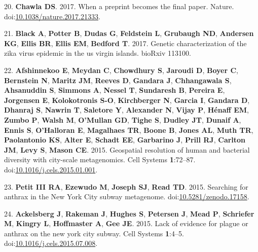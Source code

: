 \documentclass[11pt,]{article}
\begin{document}
\hypertarget{ref-SinghChawla2017}{}
20. \textbf{Chawla DS}. 2017. When a preprint becomes the final paper.
Nature.
doi:\href{https://doi.org/10.1038/nature.2017.21333}{10.1038/nature.2017.21333}.

\hypertarget{ref-Black2017}{}
21. \textbf{Black A}, \textbf{Potter B}, \textbf{Dudas G},
\textbf{Feldstein L}, \textbf{Grubaugh ND}, \textbf{Andersen KG},
\textbf{Ellis BR}, \textbf{Ellis EM}, \textbf{Bedford T}. 2017. Genetic
characterization of the zika virus epidemic in the us virgin islands.
bioRxiv 113100.

\hypertarget{ref-Afshinnekoo2015a}{}
22. \textbf{Afshinnekoo E}, \textbf{Meydan C}, \textbf{Chowdhury S},
\textbf{Jaroudi D}, \textbf{Boyer C}, \textbf{Bernstein N},
\textbf{Maritz JM}, \textbf{Reeves D}, \textbf{Gandara J},
\textbf{Chhangawala S}, \textbf{Ahsanuddin S}, \textbf{Simmons A},
\textbf{Nessel T}, \textbf{Sundaresh B}, \textbf{Pereira E},
\textbf{Jorgensen E}, \textbf{Kolokotronis S-O}, \textbf{Kirchberger N},
\textbf{Garcia I}, \textbf{Gandara D}, \textbf{Dhanraj S},
\textbf{Nawrin T}, \textbf{Saletore Y}, \textbf{Alexander N},
\textbf{Vijay P}, \textbf{Hénaff EM}, \textbf{Zumbo P}, \textbf{Walsh
M}, \textbf{O'Mullan GD}, \textbf{Tighe S}, \textbf{Dudley JT},
\textbf{Dunaif A}, \textbf{Ennis S}, \textbf{O'Halloran E},
\textbf{Magalhaes TR}, \textbf{Boone B}, \textbf{Jones AL}, \textbf{Muth
TR}, \textbf{Paolantonio KS}, \textbf{Alter E}, \textbf{Schadt EE},
\textbf{Garbarino J}, \textbf{Prill RJ}, \textbf{Carlton JM},
\textbf{Levy S}, \textbf{Mason CE}. 2015. Geospatial resolution of human
and bacterial diversity with city-scale metagenomics. Cell Systems
\textbf{1}:72--87.
doi:\href{https://doi.org/10.1016/j.cels.2015.01.001}{10.1016/j.cels.2015.01.001}.

\hypertarget{ref-Petit2015}{}
23. \textbf{Petit III RA}, \textbf{Ezewudo M}, \textbf{Joseph SJ},
\textbf{Read TD}. 2015. Searching for anthrax in the New York City
subway metagenome.
doi:\href{https://doi.org/10.5281/zenodo.17158}{10.5281/zenodo.17158}.

\hypertarget{ref-Ackelsberg2015}{}
24. \textbf{Ackelsberg J}, \textbf{Rakeman J}, \textbf{Hughes S},
\textbf{Petersen J}, \textbf{Mead P}, \textbf{Schriefer M},
\textbf{Kingry L}, \textbf{Hoffmaster A}, \textbf{Gee JE}. 2015. Lack of
evidence for plague or anthrax on the new york city subway. Cell Systems
\textbf{1}:4--5.
doi:\href{https://doi.org/10.1016/j.cels.2015.07.008}{10.1016/j.cels.2015.07.008}.
\end{document}
